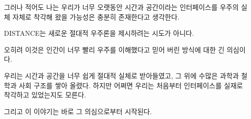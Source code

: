 \documentclass[12pt]{article}
\begin{document}
그러나 적어도 나는 우리가 너무 오랫동안 시간과 공간이라는 인터페이스를 우주의 실체 자체로 착각해 왔을 가능성은 충분히 존재한다고 생각한다.

DISTANCE는 새로운 절대적 우주론을 제시하려는 시도가 아니다.

오히려 이것은 인간이 너무 빨리 우주를 이해했다고 믿어 버린 방식에 대한 긴 의심이다.

우리는 시간과 공간을 너무 쉽게 절대적 실체로 받아들였고, 그 위에 수많은 과학과 철학과 사회 구조를 쌓아 올렸다. 하지만 어쩌면 우리는 처음부터 인터페이스를 실재로 착각하고 있었는지도 모른다.

그리고 이 이야기는 바로 그 의심으로부터 시작된다.
\end{document}
